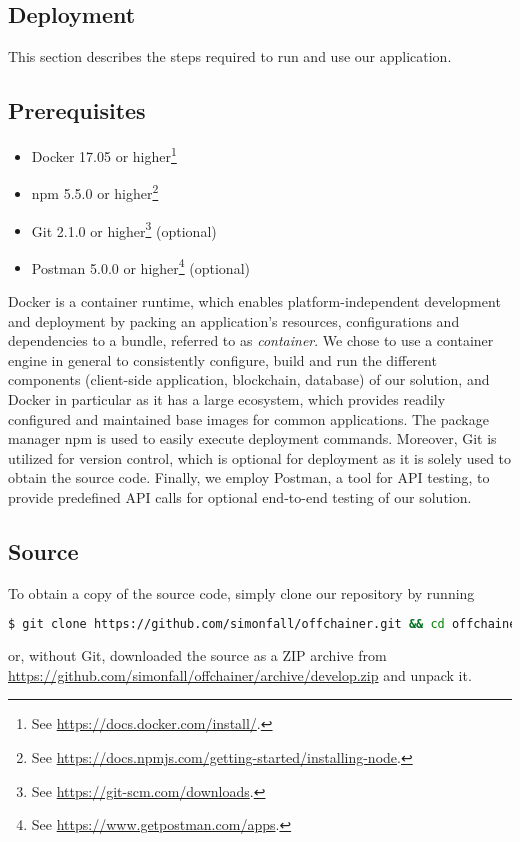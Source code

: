 \subsection{Deployment}

This section describes the steps required to run and use our application.

\subsection*{Prerequisites}

\begin{itemize}
	\item Docker 17.05 or higher\footnote{See \url{https://docs.docker.com/install/}.}
	\item npm 5.5.0 or higher\footnote{See \url{https://docs.npmjs.com/getting-started/installing-node}.}
	\item Git 2.1.0 or higher\footnote{See \url{https://git-scm.com/downloads}.} (optional)
	\item Postman 5.0.0 or higher\footnote{See \url{https://www.getpostman.com/apps}.} (optional)
\end{itemize}

Docker is a container runtime, which enables platform-independent development and deployment by packing an application's resources, configurations and dependencies to a bundle, referred to as \emph{container}. We chose to use a container engine in general to consistently configure, build and run the different components (client-side application, blockchain, database) of our solution, and Docker in particular as it has a large ecosystem, which provides readily configured and maintained base images for common applications. The package manager npm is used to easily execute deployment commands. Moreover, Git is utilized for version control, which is optional for deployment as it is solely used to obtain the source code. Finally, we employ Postman, a tool for API testing, to provide predefined API calls for optional end-to-end testing of our solution.

\subsection*{Source}

To obtain a copy of the source code, simply clone our repository by running
\begin{lstlisting}[language=bash]
$ git clone https://github.com/simonfall/offchainer.git && cd offchainer 
\end{lstlisting}
or, without Git, downloaded the source as a ZIP archive from \url{https://github.com/simonfall/offchainer/archive/develop.zip} and unpack it.


